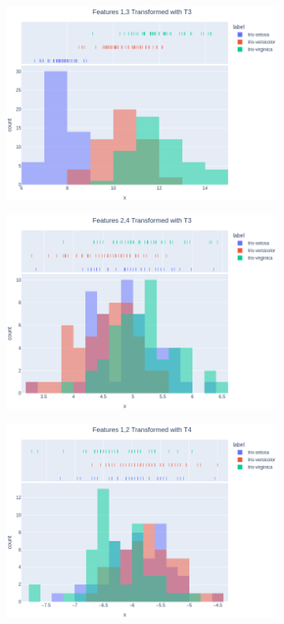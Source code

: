 \documentclass[14pt,a4]{article}
\begin{document}
\begin{figure}[h]
\begin{subfigure}{0.32\linewidth}
        \includegraphics[width=\linewidth]{images/q3/p2/13T3.png}
    \end{subfigure}
    \hfill
    \begin{subfigure}{0.32\linewidth}
        \centering
        \includegraphics[width=\linewidth]{images/q3/p2/24T3.png}
    \end{subfigure}
    \newline
    \begin{subfigure}{0.32\linewidth}
        \centering
        \includegraphics[width=\linewidth]{images/q3/p2/12T4.png}

\end{subfigure}
\end{figure}
\end{document}
